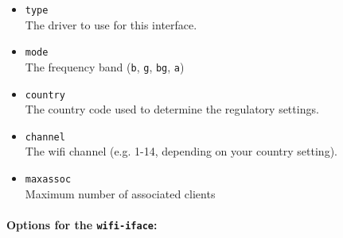 \begin{itemize}
    \item \texttt{type} \\
        The driver to use for this interface.
	
	\item \texttt{mode} \\
		The frequency band (\texttt{b}, \texttt{g}, \texttt{bg}, \texttt{a})

    \item \texttt{country} \\
        The country code used to determine the regulatory settings.

    \item \texttt{channel} \\
        The wifi channel (e.g. 1-14, depending on your country setting).

    \item \texttt{maxassoc} \\
        Maximum number of associated clients

\end{itemize}

\paragraph{Options for the \texttt{wifi-iface}:}

